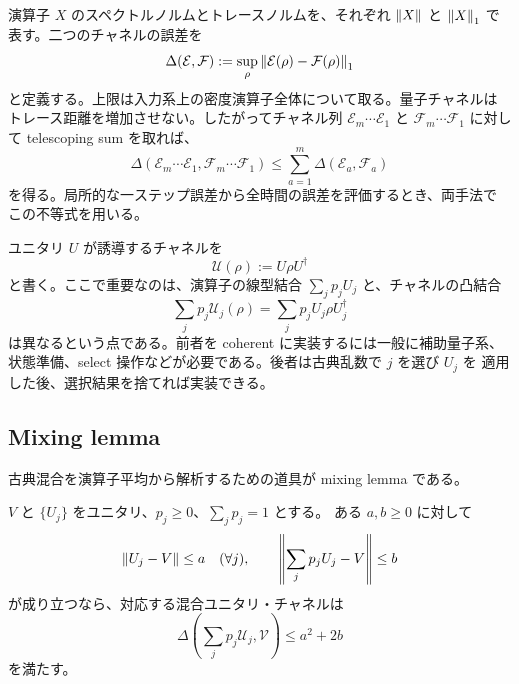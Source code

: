 \documentclass[uplatex,dvipdfmx,11pt,a4paper]{jsarticle}
\newcommand{\cE}{\mathcal{E}}
\newcommand{\cF}{\mathcal{F}}
\newcommand{\cU}{\mathcal{U}}
\newcommand{\cV}{\mathcal{V}}
\newcommand{\chanerr}{\Delta}
\begin{document}
演算子 $X$ のスペクトルノルムとトレースノルムを、それぞれ
$\norm{X}$ と $\norm{X}_1$ で表す。二つのチャネルの誤差を
\begin{equation}
  \chanerr(\cE,\cF)
  :=\sup_{\rho}\norm{\cE(\rho)-\cF(\rho)}_1
  \label{eq:channel-error}
\end{equation}
と定義する。上限は入力系上の密度演算子全体について取る。量子チャネルは
トレース距離を増加させない。したがってチャネル列 $\cE_m\cdots\cE_1$ と
$\cF_m\cdots\cF_1$ に対して telescoping sum を取れば、
\begin{equation}
  \chanerr(
    \cE_m\cdots\cE_1,
    \cF_m\cdots\cF_1)
  \leq
  \sum_{a=1}^{m}\chanerr(\cE_a,\cF_a)
  \label{eq:composition-subadditivity}
\end{equation}
を得る。局所的な一ステップ誤差から全時間の誤差を評価するとき、両手法で
この不等式を用いる。

ユニタリ $U$ が誘導するチャネルを
\begin{equation}
  \cU(\rho):=U\rho U^\dagger
\end{equation}
と書く。ここで重要なのは、演算子の線型結合
$\sum_jp_jU_j$ と、チャネルの凸結合
\begin{equation}
  \sum_jp_j\cU_j(\rho)
  =\sum_jp_jU_j\rho U_j^\dagger
\end{equation}
は異なるという点である。前者を coherent に実装するには一般に補助量子系、
状態準備、select 操作などが必要である。後者は古典乱数で $j$ を選び $U_j$ を
適用した後、選択結果を捨てれば実装できる。

\subsection{Mixing lemma}

古典混合を演算子平均から解析するための道具が mixing lemma である。

\begin{lemma}
  $V$ と $\{U_j\}$ をユニタリ、$p_j\geq0$、$\sum_jp_j=1$ とする。
  ある $a,b\geq0$ に対して
  \begin{equation}
    \norm{U_j-V}\leq a\quad(\forall j),
    \qquad
    \norm{\sum_jp_jU_j-V}\leq b
    \label{eq:mixing-assumptions}
  \end{equation}
  が成り立つなら、対応する混合ユニタリ・チャネルは
  \begin{equation}
    \chanerr\left(\sum_jp_j\cU_j,\cV\right)
    \leq a^2+2b
    \label{eq:mixing-lemma}
  \end{equation}
  を満たす。
\end{lemma}
\end{document}
